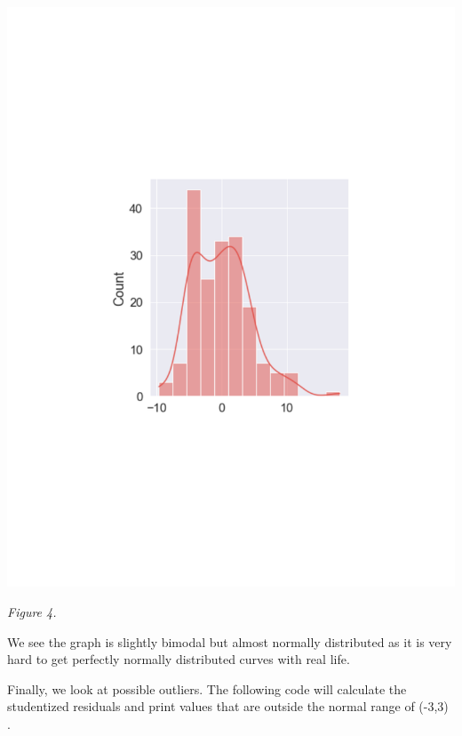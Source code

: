 \documentclass[12pt]{article}
\begin{document}
\begin{center}
    \includegraphics[width=6in]{figure6.pdf}
\end{center}

\vspace{-160pt}

\begin{center}
\textit{Figure 4.}
\end{center}

\vspace{15pt}

We see the graph is slightly bimodal but almost normally distributed as it is very hard to get perfectly normally distributed curves with real life.

\vspace{15pt}

Finally, we look at possible outliers. The following code will calculate the studentized residuals and print values that are outside the normal range of (-3,3) \citep{statologyresiduals}.
\end{document}
